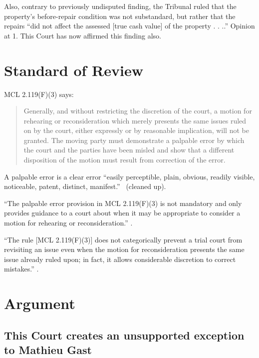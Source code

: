 \documentclass[12pt,\documentclassflag]{michiganCourtOfAppealsBrief}
\begin{document}
Also, contrary to previously undisputed finding, the Tribunal ruled that the property's before-repair condition was not substandard, but rather that the repairs ``did not affect the assessed [true cash value] of the property . . ..'' Opinion at 1. This Court has now affirmed this finding also.


\section{Standard of Review}

MCL 2.119(F)(3) says:

\begin{quote}
  Generally, and without restricting the discretion of the court, a motion for rehearing or reconsideration which merely presents the same issues ruled on by the court, either expressly or by reasonable implication, will not be granted. The moving party must demonstrate a palpable error by which the court and the parties have been misled and show that a different disposition of the motion must result from correction of the error.
\end{quote}

 A palpable error is a clear error ``easily perceptible, plain, obvious, readily
 visible, noticeable, patent, distinct, manifest.'' \ (cleaned up).
 
``The palpable error provision in MCL 2.119(F)(3)  is not mandatory and only provides guidance to
a court about when it may be appropriate to consider a motion for rehearing or reconsideration.''
.

``The rule [MCL 2.119(F)(3)] does not categorically prevent a trial court from revisiting an issue even when the motion for reconsideration presents the same issue already ruled upon; in fact, it allows considerable discretion to correct mistakes.'' . 

\section{Argument}




\subsection{This Court creates an unsupported exception to Mathieu Gast}
\end{document}
